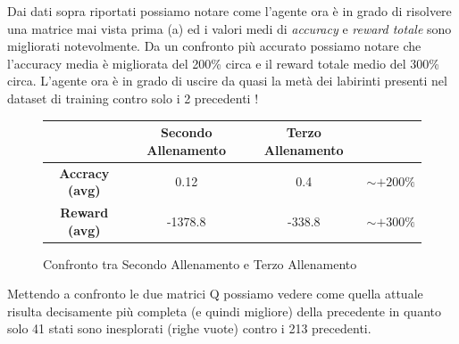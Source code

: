 Dai dati sopra riportati possiamo notare come l'agente ora \`{e} in grado di risolvere una matrice mai vista prima (a) ed i valori medi di \textit{accuracy} e \textit{reward totale} sono migliorati notevolmente. Da un confronto pi\`{u} accurato possiamo notare che l'accuracy media \`{e} migliorata del 200\% circa e il reward totale medio del 300\%  circa. L'agente ora \`{e} in grado di uscire da quasi la met\`{a} dei labirinti presenti nel dataset di training contro solo i 2 precedenti !

\begin{figure}[H]
	\centering
	\begin{tabular}{c | c | c | c}
		& \textbf{Secondo Allenamento} & \textbf{Terzo Allenamento} &  \rule{0pt}{2em}\\ [1.4em]
		\hline
		\textbf{Accracy (avg)} & 0.12 & 0.4 \rule{0pt}{2em} & $\sim +200\%$ \\ [2em]
		\hline
		\textbf{Reward (avg) }& -1378.8 & -338.8 \rule{0pt}{2em}  & $\sim +300\%$ \\ [2em]
	\end{tabular}
\caption{Confronto tra Secondo Allenamento e Terzo Allenamento}
\end{figure}

Mettendo a confronto le due matrici Q possiamo vedere come quella attuale risulta decisamente pi\`{u} completa (e quindi migliore) della precedente in quanto solo 41 stati sono inesplorati (righe vuote) contro i 213 precedenti.\\

